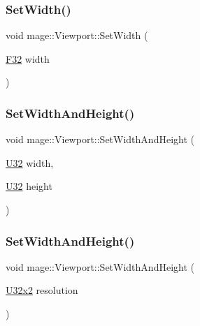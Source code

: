 \hypertarget{classmage_1_1_viewport_a377016fb769c86677d7a17c2b19960f3}{}\label{classmage_1_1_viewport_a377016fb769c86677d7a17c2b19960f3} 
\subsubsection{\texorpdfstring{Set\+Width()}{SetWidth()}\hspace{0.1cm}{\footnotesize\ttfamily [2/2]}}
{\footnotesize\ttfamily void mage\+::\+Viewport\+::\+Set\+Width (\begin{DoxyParamCaption}\item[{\hyperlink{namespacemage_aa97e833b45f06d60a0a9c4fc22ae02c0}{F32}}]{width }\end{DoxyParamCaption})\hspace{0.3cm}{\ttfamily [noexcept]}}

\hypertarget{classmage_1_1_viewport_ab3b8cdbc0b6b6e1c34bab0a4f05e0d52}{}\label{classmage_1_1_viewport_ab3b8cdbc0b6b6e1c34bab0a4f05e0d52} 
\subsubsection{\texorpdfstring{Set\+Width\+And\+Height()}{SetWidthAndHeight()}\hspace{0.1cm}{\footnotesize\ttfamily [1/4]}}
{\footnotesize\ttfamily void mage\+::\+Viewport\+::\+Set\+Width\+And\+Height (\begin{DoxyParamCaption}\item[{\hyperlink{namespacemage_a41c104c036fba3756a74e19f793eeaa1}{U32}}]{width,  }\item[{\hyperlink{namespacemage_a41c104c036fba3756a74e19f793eeaa1}{U32}}]{height }\end{DoxyParamCaption})\hspace{0.3cm}{\ttfamily [noexcept]}}

\hypertarget{classmage_1_1_viewport_a8f9b769e134942c861618ed8e42f0817}{}\label{classmage_1_1_viewport_a8f9b769e134942c861618ed8e42f0817} 
\subsubsection{\texorpdfstring{Set\+Width\+And\+Height()}{SetWidthAndHeight()}\hspace{0.1cm}{\footnotesize\ttfamily [2/4]}}
{\footnotesize\ttfamily void mage\+::\+Viewport\+::\+Set\+Width\+And\+Height (\begin{DoxyParamCaption}\item[{\hyperlink{namespacemage_a88e05bff0300120c013285d3dcad95c5}{U32x2}}]{resolution }\end{DoxyParamCaption})\hspace{0.3cm}{\ttfamily [noexcept]}}

